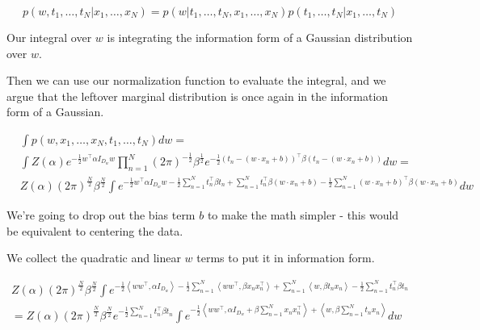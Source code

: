 \documentclass[a4paper]{article}
\begin{document}
\begin{equation}
  p(w,t_1,\ldots,t_N \vert x_1,\ldots,x_N) = p( w \vert t_1,\ldots,t_N, x_1,\ldots,x_N) p( t_1,\ldots,t_N \vert x_1,\ldots,t_N)
  \label{}
\end{equation}

Our integral over $w$ is integrating the information form of a Gaussian distribution over $w$.

Then we can use our normalization function to evaluate the integral, and we argue that the leftover marginal distribution is once again in the information form of a Gaussian.

\begin{equation}
  \begin{split}
    &\int p(w, x_1, \ldots, x_N, t_1, \ldots, t_N) dw = \\ 
    &\int 
    Z(\alpha)
    e^{ - \frac{1}{2} w^\intercal \alpha I_{D_w} w} 
    \prod_{n=1}^N
      \left( 2 \pi \right)^{ - \frac{1}{2}}
      \beta^{ \frac{1}{2} }
      e^{
	- \frac{1}{2} 
	\left( t_n - ( w \cdot x_n + b) \right)^\intercal
	\beta
	\left( t_n - ( w \cdot x_n + b) \right)
	}
    dw = \\
    & Z(\alpha) 
    \left( 2 \pi \right)^{\frac{N}{2}} 
    \beta^{\frac{N}{2}}
    \int 
      e^{ 
	- \frac{1}{2} w^\intercal \alpha I_{D_w} w
	- \frac{1}{2} \sum_{n=1}^N t_n^\intercal \beta t_n
	+ \sum_{n=1}^N t_n^\intercal \beta (w \cdot x_n + b)
	- \frac{1}{2} \sum_{n=1}^N (w \cdot x_n + b) ^\intercal \beta (w \cdot x_n + b)
      }
      dw
  \end{split}
  \label{}
\end{equation}

We're going to drop out the bias term $b$ to make the math simpler - this would be equivalent to centering the data.

We collect the quadratic and linear $w$ terms to put it in information form.

\begin{equation}
  \begin{split}
    Z(\alpha) 
    \left( 2 \pi \right)^{\frac{N}{2}} 
    \beta^{\frac{N}{2}}
    \int 
      e^{ 
	- \frac{1}{2} \left< w w^\intercal, \alpha I_{D_w} \right>
	- \frac{1}{2} \sum_{n=1}^N \left< w w^\intercal, \beta x_n x_n^\intercal \right>
	+ \sum_{n=1}^N \left< w, \beta t_n x_n \right>
        - \frac{1}{2} \sum_{n=1}^N t_n^\intercal \beta t_n
      } \\
      = Z(\alpha) 
        \left( 2 \pi \right)^{\frac{N}{2}} 
        \beta^{\frac{N}{2}}
	e^{
          - \frac{1}{2} \sum_{n=1}^N t_n^\intercal \beta t_n
	}
        \int
	  e^{
	    - \frac{1}{2} \left< w w^\intercal, \alpha I_{D_w} + \beta \sum_{n=1}^N x_n x_n^\intercal \right>
	    + \left< w, \beta \sum_{n=1}^N t_n x_n \right>
	  }
	dw
  \end{split}
  \label{}
\end{equation}
\end{document}
